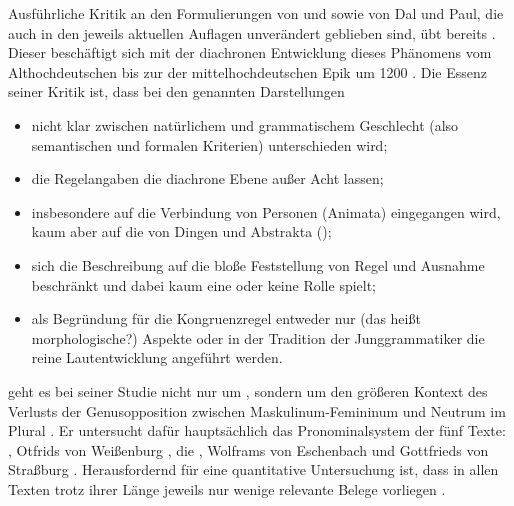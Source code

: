 Ausführliche Kritik an den Formulierungen von \citet{grimm1890,grimm1898} und
\citet{behaghel1928} sowie von Dal\nocite{dal2014} und Paul\nocite{paul2007},
die auch in den jeweils aktuellen Auflagen
\autocite{dal2014,paul2007} unverändert geblieben sind, übt bereits
\citet[11--15, 195--213]{askedal1973}. Dieser beschäftigt sich mit der
diachronen Entwicklung dieses Phänomens vom Althochdeutschen bis zur
 der mittelhochdeutschen Epik um 1200
\autocites[vgl.][317]{schneidermohr2001}[dazu auch][3--29]{johnson1999}. Die
Essenz seiner Kritik ist, dass bei den genannten Darstellungen

\begin{itemize}
	\item nicht klar zwischen natürlichem und grammatischem Geschlecht (also
		semantischen und
		formalen Kriterien) unterschieden wird;
	\item die Regelangaben die diachrone Ebene außer Acht
		lassen;
	\item insbesondere auf die Verbindung von Personen (Animata)
		eingegangen wird, kaum aber auf die von Dingen und Abstrakta
		();
	\item sich die Beschreibung auf die bloße Feststellung von Regel und
		Ausnahme beschränkt und dabei  kaum eine oder keine
		Rolle spielt;
	\item als Begründung für die Kongruenzregel entweder nur
		 (das heißt morphologische?) Aspekte oder in der Tradition
		der Junggrammatiker die reine Lautentwicklung
		angeführt werden.
\end{itemize}

\citet{askedal1973} geht es bei seiner Studie nicht nur um
, sondern um den größeren Kontext des Verlusts der
Genusopposition zwischen Maskulinum-Femininum und Neutrum im
Plural \autocite[169--177]{askedal1973}. Er
untersucht dafür hauptsächlich das Pronominalsystem der fünf Texte:
, Otfrids von Weißenburg
, die , Wolframs von
Eschenbach  und Gottfrieds von
Straßburg . Herausfordernd für eine
quantitative Untersuchung ist, dass in allen Texten trotz ihrer Länge jeweils
nur wenige relevante Belege vorliegen
\autocites[187]{askedal1973}[118]{fleischerschallert2011}.

